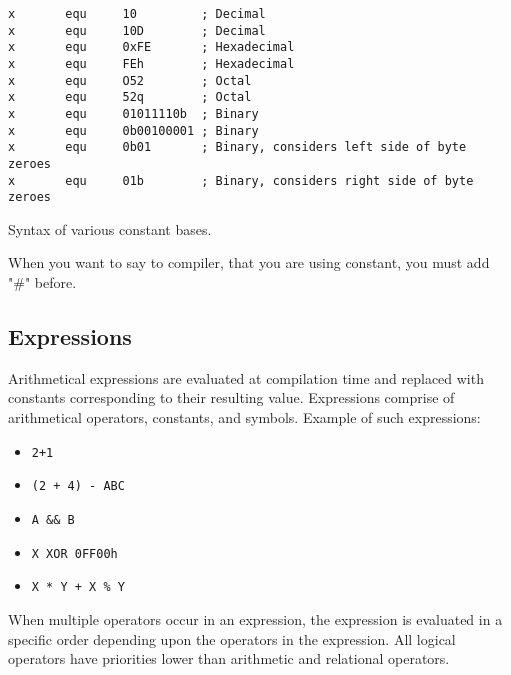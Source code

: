         \begin{code}[h!]
        {
            \usecodefont

            \verb'x       equ     10         ; Decimal'\\
            \verb'x       equ     10D        ; Decimal'\\
            \verb'x       equ     0xFE       ; Hexadecimal'\\
            \verb'x       equ     FEh        ; Hexadecimal'\\
            \verb'x       equ     O52        ; Octal'\\
            \verb'x       equ     52q        ; Octal'\\
            \verb'x       equ     01011110b  ; Binary'\\
            \verb'x       equ     0b00100001 ; Binary'\\
            \verb'x       equ     0b01       ; Binary, considers left side of byte zeroes'\\
            \verb'x       equ     01b        ; Binary, considers right side of byte zeroes'

            \caption{Syntax of various constant bases.}
            \label{code:svcb}
        }
        \end{code}

        When you want to say to compiler, that you are using constant, you must add "\#" before.

    \clearpage
    \subsection{Expressions}
        Arithmetical expressions are evaluated at compilation time and replaced with constants corresponding to their resulting value. Expressions comprise of arithmetical operators, constants, and symbols. Example of such expressions:

        \begin{itemize}
            \item \texttt{2+1}
            \item \texttt{(2 + 4) - ABC}
            \item \texttt{A \&\& B}
            \item \texttt{X XOR 0FF00h}
            \item \texttt{X * Y + X \% Y}
        \end{itemize}

        When multiple operators occur in an expression, the expression is evaluated in a specific order depending upon the operators in the expression. All logical operators have priorities lower than arithmetic and relational operators.

